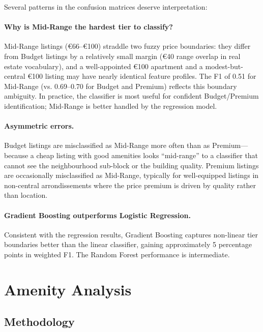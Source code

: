 \documentclass[12pt, a4paper]{article}
\begin{document}
Several patterns in the confusion matrices deserve interpretation:

\paragraph{Why is Mid-Range the hardest tier to classify?}
Mid-Range listings (\euro{}66--\euro{}100) straddle two fuzzy price boundaries: they differ from Budget listings by a relatively small margin (\euro{}40 range overlap in real estate vocabulary), and a well-appointed \euro{}100 apartment and a modest-but-central \euro{}100 listing may have nearly identical feature profiles. The F1 of 0.51 for Mid-Range (vs. 0.69--0.70 for Budget and Premium) reflects this boundary ambiguity. In practice, the classifier is most useful for confident Budget/Premium identification; Mid-Range is better handled by the regression model.

\paragraph{Asymmetric errors.}
Budget listings are misclassified as Mid-Range more often than as Premium---because a cheap listing with good amenities looks ``mid-range'' to a classifier that cannot see the neighbourhood sub-block or the building quality. Premium listings are occasionally misclassified as Mid-Range, typically for well-equipped listings in non-central arrondissements where the price premium is driven by quality rather than location.

\paragraph{Gradient Boosting outperforms Logistic Regression.}
Consistent with the regression results, Gradient Boosting captures non-linear tier boundaries better than the linear classifier, gaining approximately 5 percentage points in weighted F1. The Random Forest performance is intermediate.

\section{Amenity Analysis}
\label{sec:amenity}

\subsection{Methodology}
\end{document}
